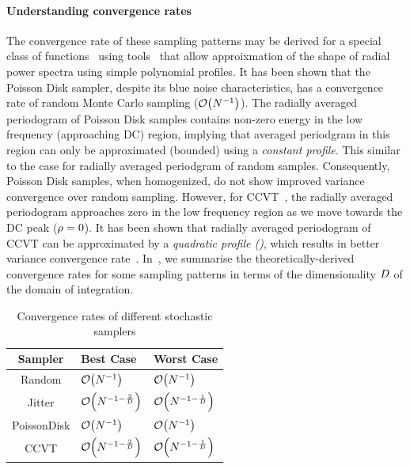 \documentclass[11pt,fleqn]{book} %
\begin{document}
\paragraph{Understanding convergence rates}
The convergence rate of these sampling patterns may be derived for a special class of functions~\cite{brandolini2001} using tools~\cite{Pilleboue:2015:VAM} that allow approixmation of the shape of radial power spectra using simple polynomial profiles. It has been shown that the Poisson Disk sampler, despite its blue noise characteristics, has a convergence rate of random Monte Carlo sampling ($\mathcal{O}\!\left(N^{-1}\right)$). The radially averaged periodogram of Poisson Disk samples contains non-zero energy in the low frequency (approaching DC) region, implying that averaged periodgram in this region can only be approximated (bounded) using a \emph{constant profile}. This similar to the case for radially averaged periodgram of random samples. Consequently, Poisson Disk samples, when homogenized, do not show improved variance convergence over random sampling. However, for CCVT~\cite{Balzer:2009:CPD:1531326.1531392}, the radially averaged periodogram approaches zero in the low frequency region as we move towards the DC peak ($\rho=0$). It has been shown that radially averaged periodogram of CCVT can be approximated by a \emph{quadratic profile ()}, which results in better variance convergence rate~\cite{Pilleboue:2015:VAM}. In~, we summarise the theoretically-derived convergence rates for some sampling patterns in terms of the dimensionality ${D}$ of the domain of integration. 
\vspace {-2ex}

\begin{table}[ht]
  \centering
  \caption{Convergence rates of different stochastic samplers}
  \label{tab:convergencerates}
  \begin{tabular}{|c|l|l|}
    \hline
    Sampler & Best Case & Worst Case \\
    \hline
    Random & $\mathcal{O}\!\left(N^{-1}\right)$ & $\mathcal{O}\!\left(N^{-1}\right)$ \\
    Jitter &  $\mathcal{O}\!\left(N^{-1-\frac{2}{{D}}}\right)$ & $\mathcal{O}\!\left(N^{-1-\frac{1}{{D}}}\right)$\\ 
    PoissonDisk & $\mathcal{O}\!\left(N^{-1}\right)$ & $\mathcal{O}\!\left(N^{-1}\right)$\\
    CCVT & $\mathcal{O}\!\left(N^{-1-\frac{2}{{D}}}\right)$ & $\mathcal{O}\!\left(N^{-1-\frac{1}{{D}}}\right)$ \\ 
    \hline
  \end{tabular}
\end{table}
\vspace {-2ex}
\end{document}
